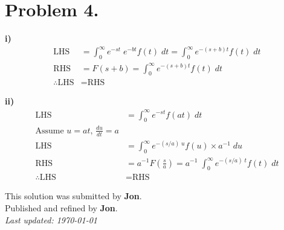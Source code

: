 ﻿\documentclass[12pt]{article}
\begin{document}
	
	
	\section*{Problem 4.}
	\textbf{i)}
	$$
	\begin{aligned}
	\text{LHS}&=\int_{0}^{\infty}e^{-st}\;e^{-bt}f(t)\;dt=\int_{0}^{\infty}e^{-(s+b)t}f(t)\;dt\\
	\text{RHS}&=F(s+b)=\int_{0}^{\infty}e^{-(s+b)t}f(t)\;dt\\
	\therefore\text{LHS}&=\text{RHS}
	\end{aligned}
	$$

	\textbf{ii)}
	$$
	\begin{aligned}
		\text{LHS}&=\int_{0}^{\infty}e^{-st}f(at)\;dt\\
		\text{Assume } u=at\text{, }\frac{du}{dt}=a\\
		\text{LHS}&=\int_{0}^{\infty}e^{-(s/a)\;u}f(u)\times a^{-1}\;du\\
		\text{RHS}&=a^{-1}F(\frac{s}{a})=a^{-1}\;\int_{0}^{\infty}e^{-(s/a)\;t}f(t)\;dt\\
		\therefore \text{LHS}&=\text{RHS}
	\end{aligned}
	$$

	\thispagestyle{empty}
	
	\begin{center}
		This solution was submitted by \textbf{Jon}.\\[4pt]
		Published and refined by \textbf{Jon}.\\[8pt]
		\textit{Last updated: \today}
	\end{center}
	
\end{document}
